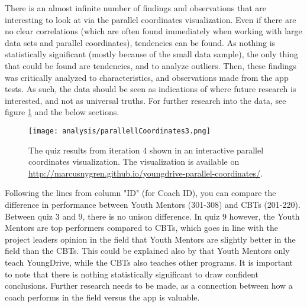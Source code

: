 There is an almost infinite number of findings and observations that are interesting to look at via the parallel coordinates visualization. Even if there are no clear correlations (which are often found immediately when working with large data sets and parallel coordinates), tendencies can be found. As nothing is statistically significant (mostly because of the small data sample), the only thing that could be found are tendencies, and to analyze outliers. Then, these findings was critically analyzed to characteristics, and observations made from the app tests. As such, the data should be seen as indications of where future research is interested, and not as universal truths. For further research into the data, see figure \ref{fig:parallellCoordinates3} and the below sections.

\begin{figure}[h]
    \centering
    \texttt{[image: analysis/parallellCoordinates3.png]}
    \caption{The quiz results from iteration 4 shown in an interactive parallel coordinates visualization. The visualization is available on \url{http://marcusnygren.github.io/youngdrive-parallel-coordinates/}.}
    \label{fig:parallellCoordinates3}
\end{figure}

\clearpage



Following the lines from column "ID" (for Coach ID), you can compare the difference in performance between Youth Mentors (301-308) and CBTs (201-220). Between quiz 3 and 9, there is no unison difference. In quiz 9 however, the Youth Mentors are top performers compared to CBTs, which goes in line with the project leaders opinion in the field that Youth Mentors are slightly better in the field than the CBTs. This could be explained also by that Youth Mentors only teach YoungDrive, while the CBTs also teaches other programs. It is important to note that there is nothing statistically significant to draw confident conclusions. Further research needs to be made, as a connection between how a coach performs in the field versus the app is valuable. %

